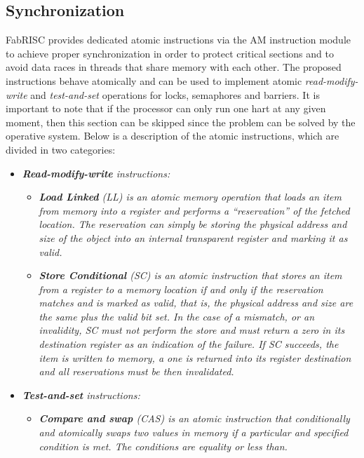     \subsection{Synchronization}

        \vspace{10pt}

        FabRISC provides dedicated atomic instructions via the AM instruction module to achieve proper synchronization in order to protect critical sections and to avoid data races in threads that share memory with each other. The proposed instructions behave atomically and can be used to implement atomic \textit{read-modify-write} and \textit{test-and-set} operations for locks, semaphores and barriers. It is important to note that if the processor can only run one hart at any given moment, then this section can be skipped since the problem can be solved by the operative system. Below is a description of the atomic instructions, which are divided in two categories:

        \begin{itemize}

            \item \textit{\textbf{Read-modify-write} instructions:}

            \begin{itemize}

                \item \textit{\textbf{Load Linked} (LL) is an atomic memory operation that loads an item from memory into a register and performs a ``reservation'' of the fetched location. The reservation can simply be storing the physical address and size of the object into an internal transparent register and marking it as valid.}

                \item \textit{\textbf{Store Conditional} (SC) is an atomic instruction that stores an item from a register to a memory location if and only if the reservation matches and is marked as valid, that is, the physical address and size are the same plus the valid bit set. In the case of a mismatch, or an invalidity, SC must not perform the store and must return a zero in its destination register as an indication of the failure. If SC succeeds, the item is written to memory, a one is returned into its register destination and all reservations must be then invalidated.}

            \end{itemize}

            \item \textit{\textbf{Test-and-set} instructions:}

            \begin{itemize}

                \item \textit{\textbf{Compare and swap} (CAS) is an atomic instruction that conditionally and atomically swaps two values in memory if a particular and specified condition is met. The conditions are equality or less than.}

            \end{itemize}

        \end{itemize}

